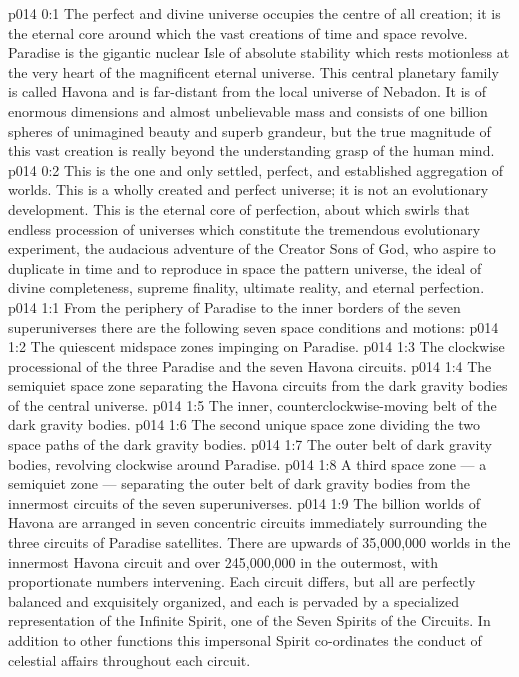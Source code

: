 \author{Perfector of Wisdom}
\vs p014 0:1 The perfect and divine universe occupies the centre of all creation; it is the eternal core around which the vast creations of time and space revolve. Paradise is the gigantic nuclear Isle of absolute stability which rests motionless at the very heart of the magnificent eternal universe. This central planetary family is called Havona and is far\hyp{}distant from the local universe of Nebadon. It is of enormous dimensions and almost unbelievable mass and consists of one billion spheres of unimagined beauty and superb grandeur, but the true magnitude of this vast creation is really beyond the understanding grasp of the human mind.
\vs p014 0:2 This is the one and only settled, perfect, and established aggregation of worlds. This is a wholly created and perfect universe; it is not an evolutionary development. This is the eternal core of perfection, about which swirls that endless procession of universes which constitute the tremendous evolutionary experiment, the audacious adventure of the Creator Sons of God, who aspire to duplicate in time and to reproduce in space the pattern universe, the ideal of divine completeness, supreme finality, ultimate reality, and eternal perfection.
\vs p014 1:1 From the periphery of Paradise to the inner borders of the seven superuniverses there are the following seven space conditions and motions:
\vs p014 1:2 \bibnobreakspace The quiescent midspace zones impinging on Paradise.
\vs p014 1:3 \bibnobreakspace The clockwise processional of the three Paradise and the seven Havona circuits.
\vs p014 1:4 \bibnobreakspace The semiquiet space zone separating the Havona circuits from the dark gravity bodies of the central universe.
\vs p014 1:5 \bibnobreakspace The inner, counterclockwise\hyp{}moving belt of the dark gravity bodies.
\vs p014 1:6 \bibnobreakspace The second unique space zone dividing the two space paths of the dark gravity bodies.
\vs p014 1:7 \bibnobreakspace The outer belt of dark gravity bodies, revolving clockwise around Paradise.
\vs p014 1:8 \bibnobreakspace A third space zone --- a semiquiet zone --- separating the outer belt of dark gravity bodies from the innermost circuits of the seven superuniverses.
\vs p014 1:9 \pc The billion worlds of Havona are arranged in seven concentric circuits immediately surrounding the three circuits of Paradise satellites. There are upwards of 35,000,000 worlds in the innermost Havona circuit and over 245,000,000 in the outermost, with proportionate numbers intervening. Each circuit differs, but all are perfectly balanced and exquisitely organized, and each is pervaded by a specialized representation of the Infinite Spirit, one of the Seven Spirits of the Circuits. In addition to other functions this impersonal Spirit co\hyp{}ordinates the conduct of celestial affairs throughout each circuit.
